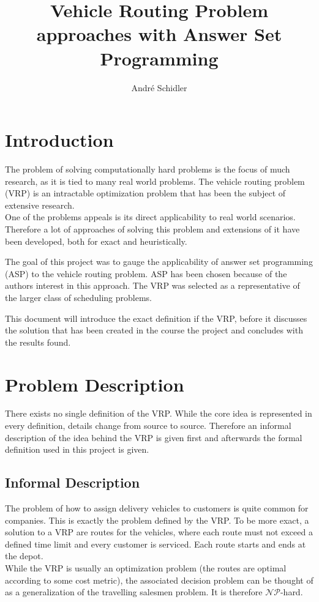 \documentclass[12pt, letterpaper]{article}
\title{Vehicle Routing Problem approaches with Answer Set Programming}
\author{André Schidler}
\begin{document}
\maketitle

\section{Introduction}
The problem of solving computationally hard problems is the focus of much research, as it is tied to many real world problems. The vehicle routing problem (VRP) is an intractable optimization problem that has been the subject of extensive research.\\
One of the problems appeals is its direct applicability to real world scenarios. Therefore a lot of approaches of solving this problem and extensions of it have been developed, both for exact and heuristically.

The goal of this project was to gauge the applicability of answer set programming (ASP) to the vehicle routing problem. ASP has been chosen because of the authors interest in this approach. The VRP was selected as a representative of the larger class of scheduling problems.

This document will introduce the exact definition if the VRP, before it discusses the solution that has been created in the course the project and concludes with the results found.

\section{Problem Description}
There exists no single definition of the VRP. While the core idea is represented in every definition, details change from source to source. Therefore an informal description of the idea behind the VRP is given first and afterwards the formal definition used in this project is given.

\subsection{Informal Description}
The problem of how to assign delivery vehicles to customers is quite common for companies. This is exactly the problem defined by the VRP. To be more exact, a solution to a VRP are routes for the vehicles, where each route must not exceed a defined time limit and every customer is serviced. Each route starts and ends at the depot.\\
While the VRP is usually an optimization problem (the routes are optimal according to some cost metric), the associated decision problem can be thought of as a generalization of the travelling salesmen problem. It is therefore $\mathcal{NP}$-hard.
\end{document}
